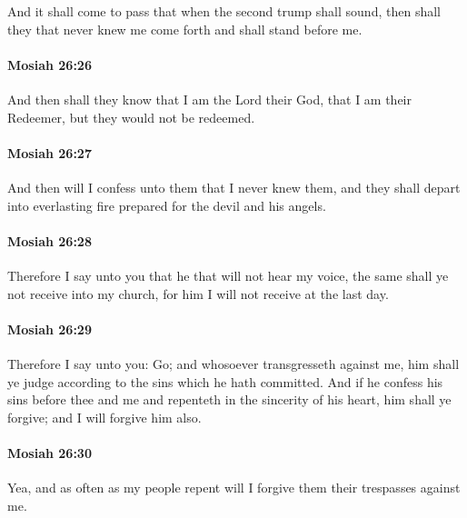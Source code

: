 			And it shall come to pass that when the second trump shall sound,
			then shall they that never knew me come forth
			and shall stand before me.

		\paragraph{Mosiah 26:26} %
			\label{MOSIAH-26-26}

			And then shall they know that I am the Lord their God,
			that I am their Redeemer,
			but they would not be redeemed.

		\paragraph{Mosiah 26:27} %
			\label{MOSIAH-26-27}

			And then will I confess unto them that I never knew them,
			and they shall depart into everlasting fire prepared for the devil and his angels.

		\paragraph{Mosiah 26:28} %
			\label{MOSIAH-26-28}

			Therefore I say unto you
			that he that will not hear my voice,
			the same shall ye not receive into my church,
			for him I will not receive at the last day.

		\paragraph{Mosiah 26:29} %
			\label{MOSIAH-26-29}

			Therefore I say unto you: Go;
			and whosoever transgresseth against me,
			him shall ye judge according to the sins which he hath committed.
			And if he confess his sins before thee and me
			and repenteth in the sincerity of his heart,
			him shall ye forgive;
			and I will forgive him also.

		\paragraph{Mosiah 26:30} %
			\label{MOSIAH-26-30}

			Yea, and as often as my people repent
			will I forgive them their trespasses against me.

